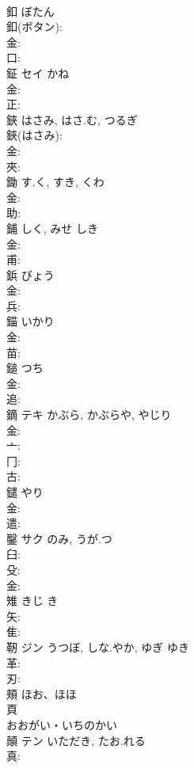 \documentclass[8pt]{extreport}
\begin{document}
\begin{CJK}{UTF8}{min}
\\	釦		ぼたん			
\\	釦(ボタン): 
\\	金: 
\\	口: 
\\	鉦	セイ	かね		
\\	金: 
\\	正: 
\\	鋏		はさみ, はさ.む, つるぎ			
\\	鋏(はさみ): 
\\	金: 
\\	夾: 
\\	鋤		す.く, すき, くわ			
\\	金: 
\\	助: 
\\	鋪		しく, みせ	しき		
\\	金: 
\\	甫: 
\\	鋲		びょう			
\\	金: 
\\	兵: 
\\	錨		いかり			
\\	金: 
\\	苗: 
\\	鎚		つち			
\\	金: 
\\	追: 
\\	鏑	テキ	かぶら, かぶらや, やじり		
\\	金: 
\\	亠: 
\\	冂: 
\\	古: 
\\	鑓		やり			
\\	金: 
\\	遣: 
\\	鑿	サク	のみ, うが.つ		
\\	臼: 
\\	殳: 
\\	金: 
\\	雉		きじ	き		
\\	矢: 
\\	隹: 
\\	靭	ジン	うつぼ, しな.やか, ゆぎ	ゆき	
\\	革: 
\\	刃: 
\\	頰		ほお、ほほ		
\\	頁	
\\	おおがい・いちのかい	
\\	顛	テン	いただき, たお.れる		
\\	真: 

\end{CJK}
\end{document}
